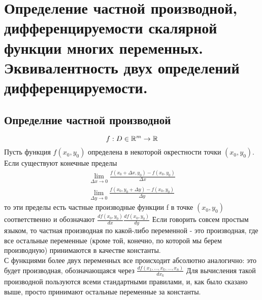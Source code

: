 \section{Определение частной производной, дифференцируемости скалярной функции многих переменных.
Эквивалентность двух определений дифференцируемости.}

\subsection{Определние частной производной}
$$
f: D\in \mathbb{R}^m \rightarrow \mathbb{R}
$$
Пусть функция $f(x_0, y_0)$ определена в некоторой окрестности точки $(x_0, y_0)$. Если существуют конечные пределы 
\begin{gather*}
\lim_{\Delta x \rightarrow 0}{\frac{f(x_0 + \Delta x, y_0) - f(x_0, y_0)}{\Delta x}}
\\
\lim_{\Delta y \rightarrow 0}{\frac{f(x_0, y_0 + \Delta y) - f(x_0, y_0)}{\Delta y}}
\end{gather*}
то эти пределы есть частные производные функции f в точке $(x_0, y_0)$ соответственно и обозначают $\frac{df(x_0, y_0)}{dx}  \frac{df(x_0, y_0)}{dy}$
Если говорить совсем простым языком, то частная производная по какой-либо переменной - это производная, где все остальные переменные (кроме той, конечно, по которой мы берем производную) принимаются в качестве константы.
\\
С функциями более двух переменных все происходит абсолютно аналогично: это будет производная, обозначающаяся через $\frac{df(x_1,...,x_k,...,x_n)}{dx_k}$
Для вычисления такой производной пользуются всеми стандартными правилами, и, как было сказано выше, просто принимают остальные переменные за константы.

